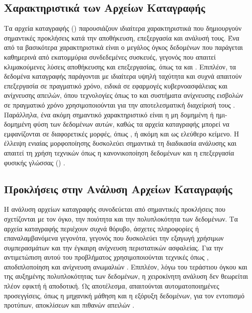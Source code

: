 \subsection{Χαρακτηριστικά των Αρχείων Καταγραφής}

Τα αρχεία καταγραφής () παρουσιάζουν ιδιαίτερα χαρακτηριστικά που δημιουργούν σημαντικές προκλήσεις κατά την αποθήκευση, επεξεργασία και ανάλυσή τους. Ένα από τα βασικότερα χαρακτηριστικά είναι ο μεγάλος όγκος δεδομένων που παράγεται καθημερινά από εκατομμύρια συνδεδεμένες συσκευές, γεγονός που απαιτεί κλιμακούμενες λύσεις αποθήκευσης και επεξεργασίας, όπως τα  και  \cite{behl2017cybersecurity}. Επιπλέον, τα δεδομένα καταγραφής παράγονται με ιδιαίτερα υψηλή ταχύτητα και συχνά απαιτούν επεξεργασία σε πραγματικό χρόνο, ειδικά σε εφαρμογές κυβερνοασφάλειας και ανίχνευσης απειλών, όπου τεχνολογίες όπως το  και συστήματα ανίχνευσης εισβολών σε πραγματικό χρόνο χρησιμοποιούνται για την αποτελεσματική διαχείρισή τους \cite{chen2014big}. Παράλληλα, ένα ακόμη σημαντικό χαρακτηριστικό είναι η μη δομημένη ή ημι-δομημένη φύση των δεδομένων αυτών, καθώς τα αρχεία καταγραφής μπορεί να εμφανίζονται σε διαφορετικές μορφές, όπως ,  ή ακόμη και ως ελεύθερο κείμενο. Η έλλειψη ενιαίας μορφοποίησης δυσκολεύει σημαντικά τη διαδικασία ανάλυσης και απαιτεί τη χρήση τεχνικών όπως η κανονικοποίηση δεδομένων και η επεξεργασία φυσικής γλώσσας () \cite{he2017drain}.

\subsection{Προκλήσεις στην Ανάλυση Αρχείων Καταγραφής}

Η ανάλυση αρχείων καταγραφής συνοδεύεται από σημαντικές προκλήσεις που σχετίζονται με τον όγκο, την ποιότητα και την πολυπλοκότητα των δεδομένων. Τα αρχεία καταγραφής περιέχουν συχνά θόρυβο, άσχετες πληροφορίες ή επαναλαμβανόμενα γεγονότα, γεγονός που δυσκολεύει την εξαγωγή χρήσιμων συμπερασμάτων και την έγκαιρη ανίχνευση περιστατικών ασφαλείας. Για την αντιμετώπιση αυτού του προβλήματος χρησιμοποιούνται τεχνικές όπως , αποδιπλοποίηση και ανίχνευση ανωμαλιών \cite{xu2009detecting}. Επιπλέον, λόγω του τεράστιου όγκου και της αυξημένης πολυπλοκότητας των δεδομένων, η χειροκίνητη ανάλυση δεν θεωρείται πλέον εφικτή ή αποδοτική. Ως αποτέλεσμα, απαιτούνται αυτοματοποιημένες προσεγγίσεις, όπως η μηχανική μάθηση και η εξόρυξη δεδομένων, για τον εντοπισμό προτύπων, αποκλίσεων και πιθανών απειλών \cite{garcia2014anomaly}.

